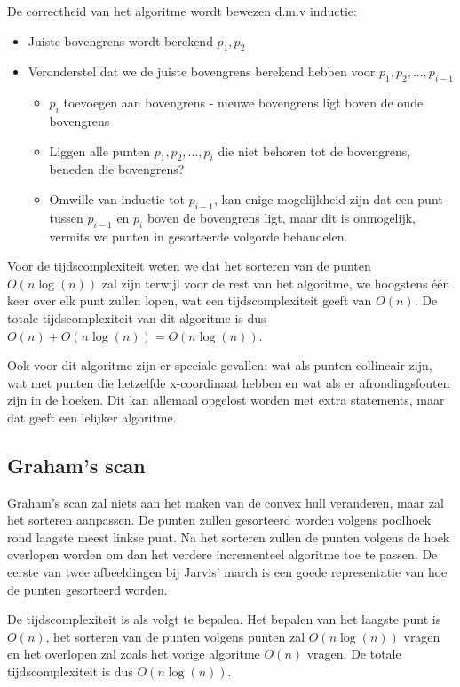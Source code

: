 \documentclass[12pt,a4paper]{article}
\begin{document}
	De correctheid van het algoritme wordt bewezen d.m.v inductie: 
	\begin{itemize}
		\item Juiste bovengrens wordt berekend ${p_1, p_2}$
		\item Veronderstel dat we de juiste bovengrens berekend hebben voor ${p_1, p_2, ..., p_{i-1}}$
		\begin{itemize}
			\item $p_i$ toevoegen aan bovengrens - nieuwe bovengrens ligt boven de oude bovengrens
			\item Liggen alle punten ${p_1, p_2, ..., p_i}$ die niet behoren tot de bovengrens, beneden die bovengrens?
			\item Omwille van inductie tot $p_{i-1}$, kan enige mogelijkheid zijn dat een punt tussen $p_{i-1}$ en $p_i$ boven de bovengrens ligt, maar dit is onmogelijk, vermits we punten in gesorteerde volgorde behandelen. 
		\end{itemize}
	\end{itemize}
	Voor de tijdscomplexiteit weten we dat het sorteren van de punten $O(n\log(n))$ zal zijn terwijl voor de rest van het algoritme, we hoogstens één keer over elk punt zullen lopen, wat een tijdscomplexiteit geeft van $O(n)$. De totale tijdscomplexiteit van dit algoritme is dus \(O(n) + O(n\log(n)) = O(n\log(n))\).
	
	Ook voor dit algoritme zijn er speciale gevallen: wat als punten collineair zijn, wat met punten die hetzelfde x-coordinaat hebben en wat als er afrondingsfouten zijn in de hoeken. Dit kan allemaal opgelost worden met extra statements, maar dat geeft een lelijker algoritme. 
	
	
	\subsection{Graham's scan}
	Graham's scan zal niets aan het maken van de convex hull veranderen, maar zal het sorteren aanpassen. De punten zullen gesorteerd worden volgens poolhoek rond laagste meest linkse punt. Na het sorteren zullen de punten volgens de hoek overlopen worden om dan het verdere incrementeel algoritme toe te passen. De eerste van twee afbeeldingen bij Jarvis' march is een goede representatie van hoe de punten gesorteerd worden. 
	
	De tijdscomplexiteit is als volgt te bepalen. Het bepalen van het laagste punt is $O(n)$, het sorteren van de punten volgens punten zal $O(n\log(n))$ vragen en het overlopen zal zoals het vorige algoritme $O(n)$ vragen. De totale tijdscomplexiteit is dus $O(n\log(n))$. 
	
\end{document}
